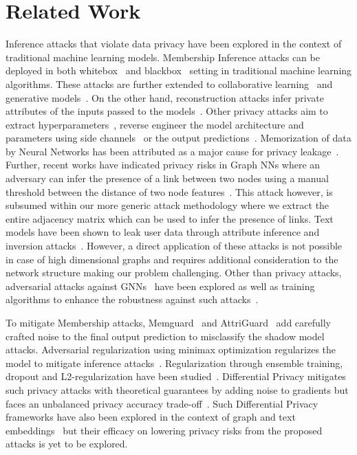 \section{Related Work}
\label{related}


Inference attacks that violate data privacy have been explored in the context of traditional machine learning models.
Membership Inference attacks can be deployed in both whitebox~\cite{whitebox} and blackbox~\cite{membershipinf} setting in traditional machine learning algorithms.
These attacks are further extended to collaborative learning~\cite{collabinf,whitebox} and generative models~\cite{logan}.
On the other hand, reconstruction attacks infer private attributes of the inputs passed to the models~\cite{attributeinf, attributeinf2, propertyinf, modelinversion}.
Other privacy attacks aim to extract hyperparameters~\cite{8418595}, reverse engineer the model architecture and parameters using side channels~\cite{timing} or the output predictions~\cite{stealml}.
Memorization of data by Neural Networks has been attributed as a major cause for privacy leakage~\cite{memorize,secretsharer,overlearninginf}.
%
Further, recent works have indicated privacy risks in Graph NNs where an adversary can infer the presence of a link between two nodes using a manual threshold between the distance of two node features~\cite{linksteal}.
This attack however, is subsumed within our more generic attack methodology where we extract the entire adjacency matrix which can be used to infer the presence of links.
Text models have been shown to leak user data through attribute inference and inversion attacks~\cite{textembleak,nlp}. 
However, a direct application of these attacks is not possible in case of high dimensional graphs and requires additional consideration to the network structure making our problem challenging.
Other than privacy attacks, adversarial attacks against GNNs~\cite{graphatt,nodepoison} have been explored as well as training algorithms to enhance the robustness against such attacks~\cite{robustdef1,robustdef2}.

To mitigate Membership attacks, Memguard~\cite{memguard} and AttriGuard~\cite{attriguard} add carefully crafted noise to the final output prediction to misclassify the shadow model attacks.
Adversarial regularization using minimax optimization regularizes the model to mitigate inference attacks~\cite{advreg}.
Regularization through ensemble training, dropout and L2-regularization have been studied~\cite{ndss19salem}.
Differential Privacy mitigates such privacy attacks with theoretical guarantees by adding noise to gradients but faces an unbalanced privacy accuracy trade-off~\cite{diffpriv}.
Such Differential Privacy frameworks have also been explored in the context of graph and text embeddings~\cite{dptext,dpne} but their efficacy on lowering privacy risks from the proposed attacks is yet to be explored.
